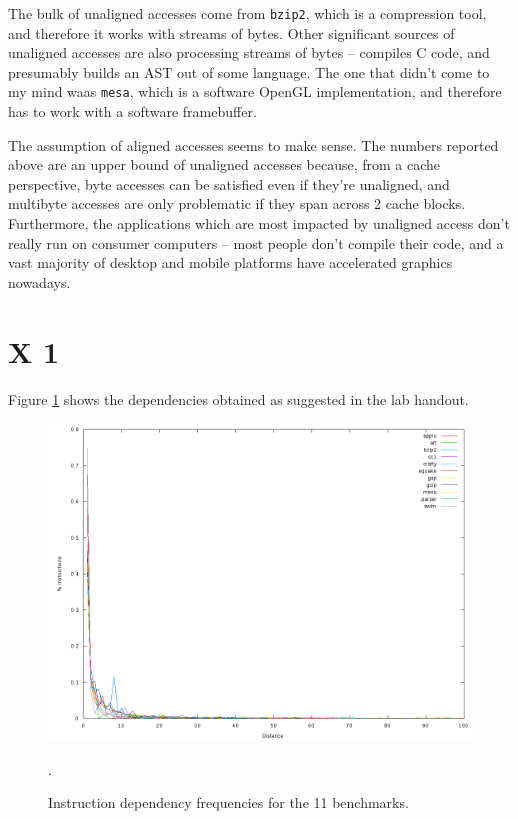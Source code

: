 The bulk of unaligned accesses come from \texttt{bzip2}, which is a
compression tool, and therefore it works with streams of bytes. Other
significant sources of unaligned accesses are also processing streams
of bytes --  compiles C code, and  presumably builds an
AST out of some language. The one that didn't come to my mind waas
\texttt{mesa}, which is a software OpenGL implementation, and therefore has to
work with a software framebuffer.

The assumption of aligned accesses seems to make sense. The numbers reported
above are an upper bound of unaligned accesses because, from a cache
perspective, byte accesses can be satisfied even if they're unaligned, and
multibyte accesses are only problematic if they span across 2 cache blocks.
Furthermore, the applications which are most impacted by unaligned access don't
really run on consumer computers -- most people don't compile their code, and a
vast majority of desktop and mobile platforms have accelerated graphics
nowadays.


\section{X 1}
Figure \ref{q1:frequencies} shows the dependencies obtained as suggested in the
lab handout.

\begin{figure}[htb]
  \includegraphics[width=6.8in]{6.823/lab1/figs/frequencies.png}
  \caption{Instruction dependency frequencies for the 11 benchmarks. }
  \label{q1:frequencies}.
\end{figure}

